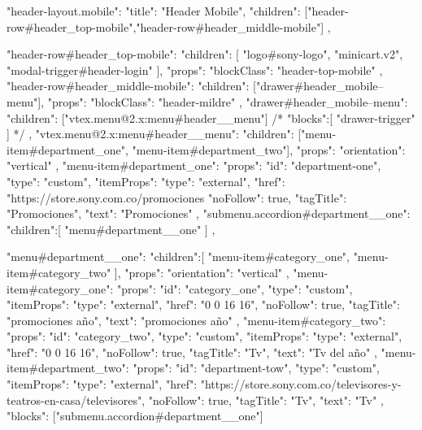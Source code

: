 {
  "header-layout.mobile": {
    "title": "Header Mobile",
    "children": ["header-row#header_top-mobile","header-row#header_middle-mobile"]
  },

  "header-row#header_top-mobile": {
    "children": [
      "logo#sony-logo",
      "minicart.v2",
      "modal-trigger#header-login"
    ],
    "props": {
      "blockClass": "header-top-mobile"
    }
  },
  "header-row#header_middle-mobile": {
    "children": ["drawer#header_mobile--menu"],
    "props": {
      "blockClass": "header-mildre"
    }
  },
  "drawer#header_mobile--menu": {
    "children": ["vtex.menu@2.x:menu#header__menu"]
    /* "blocks":[
   "drawer-trigger" 
  ] */
  },
  "vtex.menu@2.x:menu#header__menu": {
    "children": ["menu-item#department_one", "menu-item#department_two"],
    "props": {
      "orientation": "vertical"
    }
  },
  "menu-item#department_one": {
    "props": {
      "id": "department-one",
      "type": "custom",
      "itemProps": {
        "type": "external",
        "href": "https://store.sony.com.co/promociones%
        "noFollow": true,
        "tagTitle": "Promociones",
        "text": "Promociones"
      }
    }
  },
  "submenu.accordion#department__one":{
    "children":[
      "menu#department__one"
    ]
  },

  "menu#department__one":{
    "children":[
      "menu-item#category_one",
      "menu-item#category_two"
    ],
    "props": {
      "orientation": "vertical"
    }
  },
  "menu-item#category_one":{
    "props": {
      "id": "category_one",
      "type": "custom",
      "itemProps": {
        "type": "external",
        "href": "0 0 16 16",
        "noFollow": true,
        "tagTitle": "promociones año",
        "text": "promociones año"
      }
    }
  },
  "menu-item#category_two":{
    "props": {
      "id": "category_two",
      "type": "custom",
      "itemProps": {
        "type": "external",
        "href": "0 0 16 16",
        "noFollow": true,
        "tagTitle": "Tv",
        "text": "Tv del año"
      }
    }
  },
  "menu-item#department_two": {
    "props": {
      "id": "department-tow",
      "type": "custom",
      "itemProps": {
        "type": "external",
        "href": "https://store.sony.com.co/televisores-y-teatros-en-casa/televisores",
        "noFollow": true,
        "tagTitle": "Tv",
        "text": "Tv"
      }
    },
    "blocks": ["submenu.accordion#department__one"]
  }
}